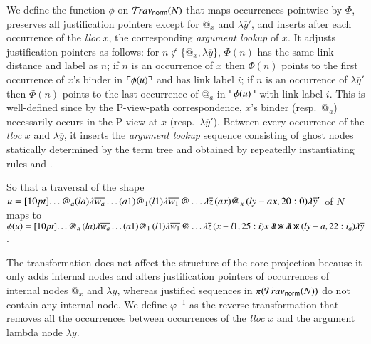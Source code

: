 \documentclass{elsarticle}
\newif\iflongversion
\theoremstyle{plain}
\theoremstyle{definition}
\newcommand{\ghostlmd}{{\lambda\mkern-7mu \lambda}}
\newcommand{\ghostvar}{\mathsf{x\mkern-5mu x}}
\newcommand{\normalizing}{{\sf norm}}
\newcommand{\travsetnorm}{\travset_\normalizing} %
\def\coresymbol{\pi} %
\newcommand\bulklambda[1]{{\lambda\overline{#1}}}
\begin{document}
We define the function $\phi$ on $\travsetnorm(N)$
that maps occurrences pointwise by $\Phi$,
preserves all justification pointers except
for $@_x$ and $\lambda\overline{y}'$,
and inserts after each occurrence of the \emph{lloc} $x$, the corresponding \emph{argument lookup} of $x$.
It adjusts justification pointers as follows:
for $n\not\in \{ @_x, \lambda\overline{y} \}$, $\Phi(n)$ has the same link distance and label as $n$;
if $n$ is an occurrence of $x$ then $\Phi(n)$ points to the first occurrence of $x$'s binder in $\ulcorner \phi(u) \urcorner$ and has link label $i$;
if $n$ is an occurrence of $\lambda\overline{y}'$ then  $\Phi(n)$ points to the last occurrence of $@_a$ in $\ulcorner \phi(u) \urcorner$ with link label $i$.
This is well-defined since by the P-view-path correspondence, $x$'s binder (resp.\ $@_a$) necessarily occurs in the P-view at $x$ (resp.\ $\lambda\overline{y}'$).
%
Between every occurrence of the \emph{lloc} $x$ and $\lambda\overline{y}$,
it inserts the \emph{argument lookup} sequence consisting of ghost
nodes statically determined by the term tree and obtained by repeatedly instantiating rules  and .
%
\iflongversion
Take a traversal $u \in \travset(N)$ involving $@_x$, its image $\phi(u)$ is given by:
\begin{eqnarray*}
    u &=& \Pstr[10pt]{ \ldots (aa){@_a} \cdot (la){\bulklambda{w_a}} \cdot \ldots (a1){@_1} \cdot (l1){\bulklambda{w_1}} \cdot @ \ldots \bulklambda{z} \cdot (ax){@_x} \cdot (ly-ax,20:0){\bulklambda{y}'} }
    \\
    \phi(u) &=& \Pstr[10pt]{ \ldots (aa){@_a} \cdot (la){\bulklambda{w_a}} \cdot \ldots (a1){@_1} \cdot (l1){\bulklambda{w_1}} \cdot @ \ldots \bulklambda{z} \cdot (x-l1,30:i) x \cdot \ghostlmd \cdot \ghostvar \ldots \ghostlmd \cdot \ghostvar \cdot (ly-a,20:i_a){\bulklambda{y}} }
\end{eqnarray*}
\else
So that a traversal of the shape
$u = \Pstr[10pt]{ \ldots @_a (la){\bulklambda{w_a}}
  \ldots (a1){@_1} (l1){\bulklambda{w_1}} \, @ \ldots \bulklambda{z} \, (ax){@_x} \, (ly-ax,20:0){\bulklambda{y}'} }$ of $N$
maps to
$\phi(u) = \Pstr[10pt]{ \ldots @_a \, (la){\bulklambda{w_a}}
\ldots (a1){@_1} \, (l1){\bulklambda{w_1}} \, @ \ldots \bulklambda{z} \, (x-l1,25:i) x \, \ghostlmd \, \ghostvar \, \ghostlmd \, \ghostvar \, (ly-a,22:i_a){\bulklambda{y}}}$.
\fi
The transformation does not affect the structure
of the core projection
because it only adds internal nodes and alters justification pointers of occurrences of internal nodes $@_x$ and $\lambda\overline y$,
whereas justified sequences in $\coresymbol(\travsetnorm(N))$ do not contain any internal node.
%
We define $\varphi^{-1}$ as the reverse transformation
that removes all the occurrences between occurrences of the \emph{lloc} $x$ and the  argument lambda node $\lambda\overline{y}$.
\end{document}
